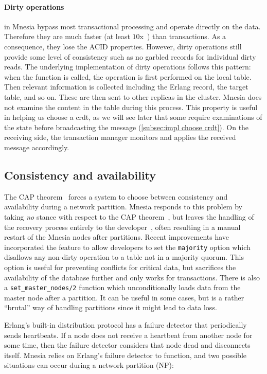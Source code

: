 \paragraph{Dirty operations} in Mnesia bypass most transactional processing
and operate directly on the data. Therefore they are much faster 
(at least \(10\)x~\cite{ericssonab2023mnesiaref}) than transactions. As a consequence,
they lose the ACID properties. However, dirty operations still provide 
some level of consistency such as no garbled records for individual dirty reads.
The underlying implementation of dirty operations follows this pattern:
when the function is called, the operation is first performed
on the local table. Then relevant information is collected including
the Erlang record, the target table, and so on. These are then sent 
to other replicas in the cluster.
Mnesia does not examine the content in the table during this process. This 
property is useful in helping us choose a \acrshort{crdt},
as we will see later that some  require examinations of the state
before broadcasting the message (\cref{subsec:impl choose crdt}).
On the receiving side, the transaction manager monitors and
applies the received message accordingly.

\subsection{Consistency and availability} \label{subsec:bg cap}

The CAP theorem~\cite{gilbert2012cap} forces a system to choose between consistency
and availability during a network partition. Mnesia responds to this problem by 
taking \emph{no} stance with respect to the CAP theorem~\cite{andersen2014mnesiacap},
but leaves the handling of the recovery process entirely 
to the developer~\cite{ericssonab2023mnesiaguide}, often resulting in a manual restart
of the Mnesia nodes after partitions. Recent improvements have incorporated
the feature to allow developers to set the \texttt{majority} option which disallows 
any non-dirty operation to a table not in a majority quorum. This option
is useful for preventing conflicts for critical data, but sacrifices the availability
of the database further and only works for transactions. There is also a
\verb|set_master_nodes/2| function which unconditionally loads data from the master node
after a partition. It can be useful in some cases, but is a rather ``brutal''
way of handling partitions since it might lead to data loss.

Erlang's built-in distribution protocol has a failure detector that periodically 
sends heartbeats. If a node does not receive a heartbeat from
another node for some time, then the failure detector considers that node dead
and disconnects itself. Mnesia relies on Erlang's failure detector to function,
and two possible situations can occur during a network partition (NP):

